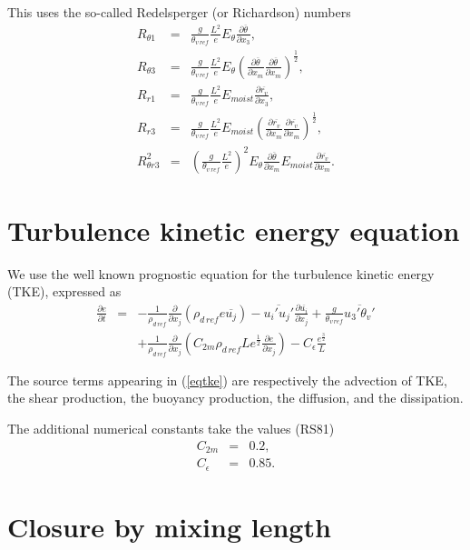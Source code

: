 This uses the so-called Redelsperger (or Richardson) numbers
\begin{eqnarray}
R_{\theta 1}&=&\frac{g}{\theta_{v\,ref}}\frac{L^2}{e}E_{\theta}\frac{\partial
\overline{\theta}}{\partial x_3}, \\
R_{\theta 3}&=&\frac{g}{\theta_{v\,ref}}\frac{L^2}{e}E_{\theta}
(\frac{\partial \overline{\theta}}{\partial x_m}
\frac{\partial \overline{\theta}}{\partial x_m} )^{\frac{1}{2}},\\
R_{r 1}&=&\frac{g}{\theta_{v\,ref}}\frac{L^2}{e}E_{moist}\frac{\partial \overline{r_v}}
{\partial x_3}, \\
R_{r 3}&=&\frac{g}{\theta_{v\,ref}}\frac{L^2}{e}E_{moist}
(\frac{\partial \overline{r_v}}{\partial x_m}
\frac{\partial \overline{r_v}}{\partial x_m} )^{\frac{1}{2}}, \\
R_{\theta r 3}^2&=&(\frac{g}{\theta_{v\,ref}}\frac{L^2}{e})^2
E_{\theta}\frac{\partial \overline{\theta}}{\partial x_m}
E_{moist}\frac{\partial \overline{r_v}}{\partial x_m}.
\end{eqnarray}


\section{Turbulence kinetic energy equation}

We use the well known prognostic equation for the turbulence kinetic energy
(TKE), expressed as
\begin{eqnarray}
\frac{\partial e}{\partial t}&=&
-\frac{1}{\rho_{d\, ref}}\frac{\partial}{\partial x_j}(\rho_{d\, ref}
 e \overline{u_j})
-\overline{u_i'u_j'}\frac{\partial \overline{u_i}}{\partial x_j}
+\frac{g}{\theta_{v\, ref}}\overline{u_3'\theta_v'}  \nonumber \\
&&+\frac{1}{\rho_{d\, ref}}\frac{\partial}{\partial x_j}(C_{2m}
\rho_{d\, ref} Le^{\frac{1}{2}}
\frac{\partial e}{\partial x_j}) -C_{\epsilon} \frac{e^{\frac{3}{2}}}{L}
\label{eqtke}
\end{eqnarray}

The source terms appearing in (\ref{eqtke}) are respectively the advection of
TKE, the shear production, the buoyancy production, the diffusion, and the
dissipation.

The additional numerical constants take the values (RS81)
\begin{eqnarray}
C_{2m}&=& 0.2, \\
C_{\epsilon}&=& 0.85.
\end{eqnarray}


\section{Closure by mixing length}

